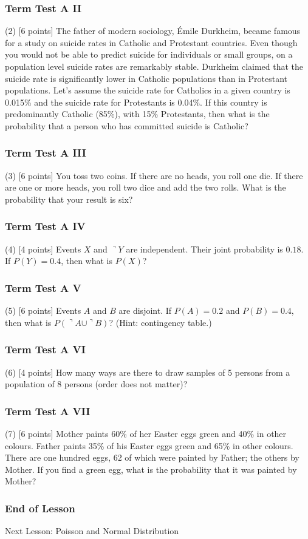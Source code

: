 \documentclass[xcolor=dvipsnames]{beamer}
\begin{document}
\begin{frame}
  \frametitle{Term Test A II}
  (2) [6 points] The father of modern sociology, {\'E}mile Durkheim,
  became famous for a study on suicide rates in Catholic and
  Protestant countries. Even though you would not be able to predict
  suicide for individuals or small groups, on a population level
  suicide rates are remarkably stable. Durkheim claimed that the
  suicide rate is significantly lower in Catholic populations than in
  Protestant populations. Let's assume the suicide rate for Catholics
  in a given country is 0.015\% and the suicide rate for Protestants
  is 0.04\%. If this country is predominantly Catholic (85\%), with
  15\% Protestants, then what is the probability that a person who has
  committed suicide is Catholic?
\end{frame}

\begin{frame}
  \frametitle{Term Test A III}
  (3) [6 points] You toss two coins. If there are no heads, you roll
  one die. If there are one or more heads, you roll two dice and add
  the two rolls. What is the probability that your result is six?
\end{frame}

\begin{frame}
  \frametitle{Term Test A IV}
  (4) [4 points] Events $X$ and $\urcorner{}Y$ are independent. Their
  joint probability is $0.18$. If $P(Y)=0.4$, then what is $P(X)$?
\end{frame}

\begin{frame}
  \frametitle{Term Test A V}
  (5) [6 points] Events $A$ and $B$ are disjoint. If $P(A)=0.2$ and
  $P(B)=0.4$, then what is $P(\urcorner{}A\cup\urcorner{}B)$? (Hint:
  contingency table.)
\end{frame}

\begin{frame}
  \frametitle{Term Test A VI}
  (6) [4 points] How many ways are there to draw samples of 5 persons
  from a population of 8 persons (order does not matter)?
\end{frame}

\begin{frame}
  \frametitle{Term Test A VII}
  (7) [6 points] Mother paints 60\% of her Easter eggs green and 40\%
  in other colours. Father paints 35\% of his Easter eggs green and
  65\% in other colours. There are one hundred eggs, 62 of which were
  painted by Father; the others by Mother. If you find a green egg,
  what is the probability that it was painted by Mother?
\end{frame}

\begin{frame}
  \frametitle{End of Lesson}
Next Lesson: Poisson and Normal Distribution
\end{frame}
\end{document}
